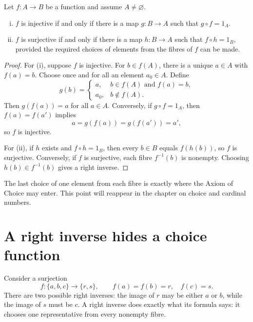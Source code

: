 \begin{theorem}
Let \(f:A\to B\) be a function and assume \(A\neq\varnothing\).
\begin{enumerate}[(i)]
  \item \(f\) is injective if and only if there is a map \(g:B\to A\) such that \(g\circ f=1_A\).
  \item \(f\) is surjective if and only if there is a map \(h:B\to A\) such that \(f\circ h=1_B\), provided the required choices of elements from the fibres of \(f\) can be made.
\end{enumerate}
\end{theorem}

\begin{proof}
For (i), suppose \(f\) is injective.  For \(b\in f(A)\), there is a unique \(a\in A\) with \(f(a)=b\).  Choose once and for all an element \(a_0\in A\).  Define
\[
  g(b)=
  \begin{cases}
    a, & b\in f(A)\text{ and }f(a)=b,\\
    a_0, & b\notin f(A).
  \end{cases}
\]
Then \(g(f(a))=a\) for all \(a\in A\).  Conversely, if \(g\circ f=1_A\), then \(f(a)=f(a')\) implies
\[
  a=g(f(a))=g(f(a'))=a',
\]
so \(f\) is injective.

For (ii), if \(h\) exists and \(f\circ h=1_B\), then every \(b\in B\) equals \(f(h(b))\), so \(f\) is surjective.  Conversely, if \(f\) is surjective, each fibre \(f^{-1}(b)\) is nonempty.  Choosing \(h(b)\in f^{-1}(b)\) gives a right inverse.
\end{proof}

\begin{caution}
The last choice of one element from each fibre is exactly where the Axiom of Choice may enter.  This point will reappear in the chapter on choice and cardinal numbers.
\end{caution}

\section{A right inverse hides a choice function}

Consider a surjection
\[
 f:\{a,b,c\}\longrightarrow\{r,s\},
 \qquad f(a)=f(b)=r,\quad f(c)=s.
\]
There are two possible right inverses: the image of $r$ may be either $a$ or $b$, while the image of $s$ must be $c$. A right inverse does exactly what its formula says: it chooses one representative from every nonempty fibre.

